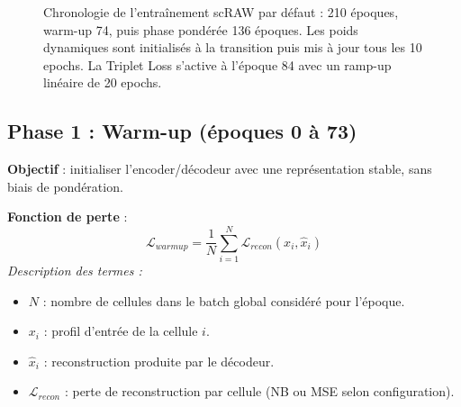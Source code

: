 \documentclass[11pt,a4paper]{article}
\begin{document}
\begin{figure}[H]
{%
}
\caption{Chronologie de l'entra\^inement scRAW par d\'efaut : 210 \'epoques, warm-up 74, puis phase pond\'er\'ee 136 \'epoques. Les poids dynamiques sont initialis\'es \`a la transition puis mis \`a jour tous les 10 epochs. La Triplet Loss s'active \`a l'\'epoque 84 avec un ramp-up lin\'eaire de 20 epochs.}
\label{fig:timeline}
\end{figure}

\subsection{Phase 1 : Warm-up (\'epoques 0 \`a 73)}
\label{sec:phase1}

\textbf{Objectif} : initialiser l'encoder/d\'ecodeur avec une repr\'esentation stable, sans biais de pond\'eration.

\textbf{Fonction de perte} :
\[
  \mathcal{L}_{warmup} = \frac{1}{N} \sum_{i=1}^{N} \mathcal{L}_{recon}(x_i, \hat{x}_i)
\]
\textit{Description des termes :}
\begin{itemize}[nosep]
  \item $N$ : nombre de cellules dans le batch global consid\'er\'e pour l'\'epoque.
  \item $x_i$ : profil d'entr\'ee de la cellule $i$.
  \item $\hat{x}_i$ : reconstruction produite par le d\'ecodeur.
  \item $\mathcal{L}_{recon}$ : perte de reconstruction par cellule (NB ou MSE selon configuration).
\end{itemize}
\end{document}
